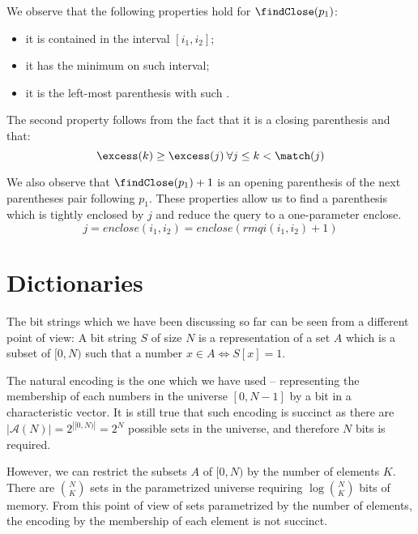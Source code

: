 We observe that the following properties hold for $\findClose(p_1)$:
\begin{itemize}
	\item it is contained in the interval $[i_1, i_2]$;
	\item it has the minimum \excess{} on such interval;
	\item it is the left-most parenthesis with such \excess{}.
\end{itemize}
The second property follows from the fact that it is a closing parenthesis and that:
$$ \excess(k) \ge \excess(j) \:\forall j \le k < \match(j) $$

We also observe that $\findClose(p_1) + 1$ is an opening parenthesis of the next parentheses pair following $p_1$.
These properties allow us to find a parenthesis which is tightly enclosed by $j$ and reduce the query to a one-parameter enclose.
$$ j = enclose(i_1, i_2) = enclose(rmqi(i_1, i_2) + 1) $$

\section{Dictionaries}

The bit strings which we have been discussing so far can be seen from a different point of view:
A bit string $S$ of size $N$ is a representation of a set $A$ which is a subset of $[0, N)$ such that a number $x \in A \iff S[x] = 1$.

The natural encoding is the one which we have used -- representing the membership of each numbers in the universe $[0, N - 1]$ by a bit in a characteristic vector.
It is still true that such encoding is succinct as there are $| \mathcal{A}(N) | = 2^{|[0, N)|} = 2^N$ possible sets in the universe, and therefore $N$ bits is required.

However, we can restrict the subsets $A$ of $[0, N)$ by the number of elements $K$.
There are ${N \choose K}$ sets in the parametrized universe requiring $\log {N \choose K}$ bits of memory.
From this point of view of sets parametrized by the number of elements, the encoding by the membership of each element is not succinct.

\bigbreak

